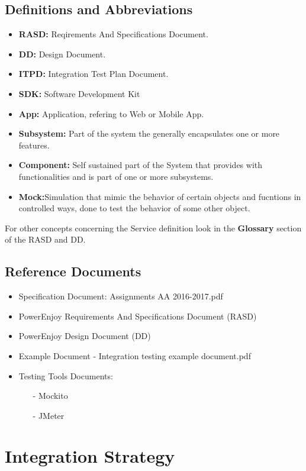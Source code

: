 \documentclass[a4paper]{article}
\begin{document}
\subsection{Definitions and Abbreviations}
\begin{itemize}
\item \textbf{RASD:} Reqirements And Specifications Document.
\item \textbf{DD:} Design Document.
\item \textbf{ITPD:} Integration Test Plan Document.
\item \textbf{SDK:} Software Development Kit
\item \textbf{App:} Application, refering to Web or Mobile App.
\item \textbf{Subsystem:} Part of the system the generally encapsulates one or more features.
\item \textbf{Component:} Self sustained part of the System that provides with functionalities and is part of one or more subsystems.
\item \textbf{Mock:}Simulation that mimic the behavior of certain objects and fucntions in controlled ways, done to test the behavior of some other object.
\end{itemize}
For other concepts concerning the Service definition look in the \textbf{Glossary} section of the RASD and DD.

\subsection{Reference Documents}
\begin{itemize}
\item Specification Document: Assignments AA 2016-2017.pdf
\item PowerEnjoy Requirements And Specifications Document (RASD)
\item PowerEnjoy Design Document (DD)
\item Example Document - Integration testing example document.pdf
\item Testing Tools Documents:
\begin{itemize}
\item[-] Mockito
\item[-] JMeter
\end{itemize}
\end{itemize}

\newpage
\section{Integration Strategy}
\end{document}
